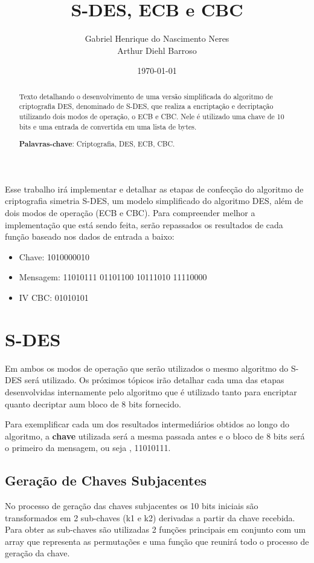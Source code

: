 \documentclass[12pt]{article}
\title{S-DES, ECB e CBC}
\author{Gabriel Henrique do Nascimento Neres \\ Arthur Diehl Barroso}
\date{\today}
\begin{document}
\maketitle

\begin{abstract}
  Texto detalhando o desenvolvimento de uma versão simplificada do algoritmo de criptografia DES, denominado de S-DES, que realiza a encriptação e decriptação utilizando dois modos de operação, o ECB e CBC. Nele é utilizado uma chave de 10 bits e uma entrada de convertida em uma lista de bytes. 

  \textbf{Palavras-chave}: Criptografia, DES, ECB, CBC.
\end{abstract}

Esse trabalho irá implementar e detalhar as etapas de confecção do algoritmo de criptografia simetria S-DES, um modelo simplificado do algoritmo DES, além de dois modos de operação (ECB e CBC). Para compreender melhor a implementação que está sendo feita, serão repassados os resultados de cada função baseado nos dados de entrada a baixo:

\begin{itemize}
  \item Chave: 1010000010
  \item Mensagem: 11010111 01101100 10111010 11110000
  \item IV CBC: 01010101
\end{itemize}

\section{S-DES}
Em ambos os modos de operação que serão utilizados o mesmo algoritmo do S-DES será utilizado. Os próximos tópicos irão detalhar cada uma das etapas desenvolvidas internamente pelo algoritmo que é utilizado tanto para encriptar quanto decriptar aum bloco de 8 bits fornecido.

Para exemplificar cada um dos resultados intermediários obtidos ao longo do algoritmo, a \textbf{chave} utilizada será a mesma passada antes e o bloco de 8 bits será o primeiro da mensagem, ou seja , 11010111. 

\subsection{Geração de Chaves Subjacentes}
No processo de geração das chaves subjacentes os 10 bits iniciais são transformados em 2 sub-chaves (k1 e k2) derivadas a partir da chave recebida. Para obter as sub-chaves são utilizadas 2 funções principais em conjunto com um array que representa as permutações e uma função que reunirá todo o processo de geração da chave.
\end{document}
